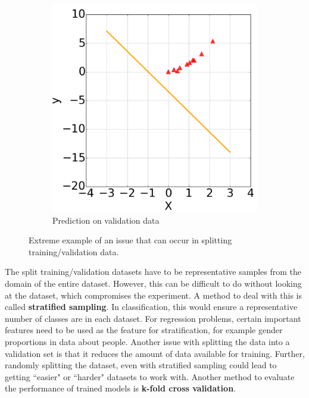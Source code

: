 \documentclass[CS5104-Notes.tex]{subfiles}
\begin{document}
\begin{figure}[H]
\begin{subfigure}{0.4\textwidth}
\includegraphics[width=1\textwidth]{imgs/validation-validation.png}
\caption{Prediction on validation data}
\end{subfigure}
\caption{Extreme example of an issue that can occur in splitting training/validation data.}
\end{figure}
\noindent
The split training/validation datasets have to be representative samples from the domain of the entire dataset. However, this can be difficult to do without looking at the dataset, which compromises the experiment. A method to deal with this is called \textbf{stratified sampling}. In classification, this would ensure a representative number of classes are in each dataset. For regression problems, certain important features need to be used as the feature for stratification, for example gender proportions in data about people. 
\n
Another issue with splitting the data into a validation set is that it reduces the amount of data available for training. Further, randomly splitting the dataset, even with stratified sampling could lead to getting ``easier" or ``harder" datasets to work with. Another method to evaluate the performance of trained models is \textbf{k-fold cross validation}.
\end{document}
